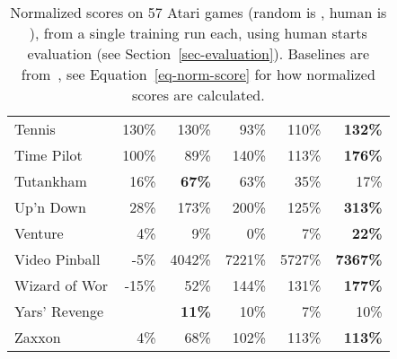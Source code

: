 \documentclass[a4paper]{article}
\begin{document}
\begin{table*}[p]
{{\begin{tabular}{|l|rr|rrr|}
Tennis & 130\% & 130\% & 93\% & 110\% & \textbf{132\%}\\
Time Pilot & 100\% & 89\% & 140\% & 113\% & \textbf{176\%}\\
Tutankham & 16\% & \textbf{67\%} & 63\% & 35\% & 17\%\\
Up'n Down & 28\% & 173\% & 200\% & 125\% & \textbf{313\%}\\
Venture & 4\% & 9\% & 0\% & 7\% & \textbf{22\%}\\
Video Pinball & -5\% & 4042\% & 7221\% & 5727\% & \textbf{7367\%}\\
Wizard of Wor & -15\% & 52\% & 144\% & 131\% & \textbf{177\%}\\
Yars' Revenge &  & \textbf{11\%} & 10\% & 7\% & 10\%\\
Zaxxon & 4\% & 68\% & 102\% & 113\% & \textbf{113\%}\\
\hline
\end{tabular}
  



} } 

\caption{
\label{tab-atari-normalized-30human}
Normalized scores on 57 Atari games (random is , human is ), from a single training run each, using human starts evaluation (see Section~\ref{sec-evaluation}).
Baselines are from~\citet{double-dqn}, see Equation~\ref{eq-norm-score} for how normalized scores are calculated.
}
\end{table*}
\end{document}
